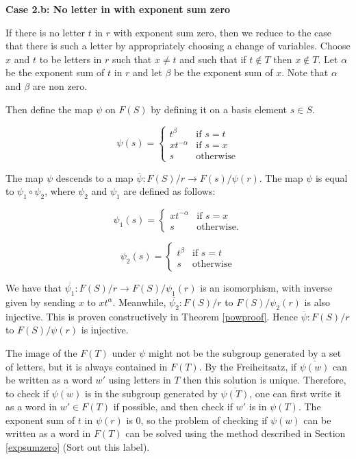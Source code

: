 \documentclass[12pt]{article} %
\theoremstyle{definition}
\theoremstyle{definition}
\theoremstyle{definition}
\theoremstyle{definition}
\theoremstyle{definition}
\theoremstyle{definition}
\begin{document}
\textbf{Case 2.b: No letter in  with exponent sum zero}\label{noexpsumzero}

If there is no letter $t$ in $r$ with exponent sum zero, then we reduce to the case
that there is such a letter by appropriately choosing a change of variables. Choose $x$
and $t$ to be letters in $r$ such that $x \ne t$ and such that if $t \notin T$ then $x \notin T$.
Let $\alpha$ be the exponent sum
of $t$ in $r$ and let $\beta$ be the exponent sum of $x$.
Note that $\alpha$ and $\beta$ are non zero.

Then define the map $\psi$ on $F(S)$ by defining it on a basis element $s \in S$.

\begin{equation}
  \psi(s) =
  \begin{cases}
     t^\beta & \text{if }s = t \\
     xt^{-\alpha} &\text{if } s = x \\
     s & \text{otherwise}
  \end{cases}
\end{equation}

The map $\psi$ descends to a map $\overline{\psi}: F(S) / r \to F(s) / \psi(r)$. The map
$\psi$ is equal to $\psi_1 \circ \psi_2$,
where $\psi_2$ and $\psi_1$ are defined as follows:

\begin{equation}
  \psi_1(s) =
  \begin{cases}
     xt^{-\alpha} &\text{if } s = x \\
     s & \text{otherwise.}
  \end{cases}
\end{equation}

\begin{equation}
  \psi_2(s) =
  \begin{cases}
     t^\beta & \text{if } s = t \\
     s & \text{otherwise}
  \end{cases}
\end{equation}

We have that $\overline{\psi_1}: F(S) / r \to F(S) / \psi_1(r)$
is an isomorphism, with inverse given by sending $x$ to $xt^\alpha$. Meanwhile,
$\overline{\psi_2}: F(S) / r$ to $F(S) / \psi_2(r)$
is also injective.
This is proven constructively in Theorem \ref{powproof}.
Hence $\overline{\psi}: F(S) / r$ to $F(S) / \psi(r)$ is injective.

The image of the $F(T)$ under $\psi$ might not be the
subgroup generated by a set of letters, but it is always contained in $F(T)$.
By the Freiheitsatz, if $\overline{\psi(w)}$ can be written
as a word $w'$ using letters in $T$ then this solution is unique.
Therefore, to check if $\overline{\psi(w)}$ is in the subgroup generated by
$\overline{\psi(T)}$, one can first write it as a word in $w' \in F(T)$ if possible,
and then check if $w'$ is in $\psi(T)$.
The exponent sum of $t$ in $\psi(r)$ is $0$, so the problem of checking
if $\psi(w)$ can be written as a word in $F(T)$ can be solved using
the method described in Section \ref{expsumzero} (Sort out this label).
\end{document}
